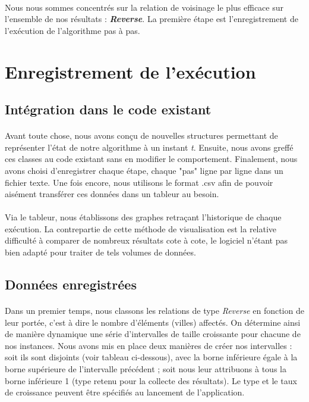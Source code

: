 \documentclass[a4paper,10pt]{report}
\begin{document}
\paragraph{}
Nous nous sommes concentrés sur la relation de voisinage le plus efficace sur
l'ensemble de nos résultats : \textbf{\textit{Reverse}}. La première étape est
l'enregistrement de l'exécution de l'algorithme pas à pas.



\section{Enregistrement de l'exécution}
\subsection{Intégration dans le code existant}

\paragraph{}
  Avant toute chose, nous avons conçu de nouvelles structures permettant de
représenter l'état de notre algorithme à un instant \textit{t}. Ensuite, nous
avons greffé ces classes au code existant sans en modifier le comportement.
Finalement, nous avons choisi d'enregistrer chaque étape, chaque "pas" ligne par
ligne dans un fichier texte. Une fois encore, nous utilisons le format .csv afin
de pouvoir aisément transférer ces données dans un tableur au besoin.

\paragraph{}
  Via le tableur, nous établissons des graphes retraçant l'historique de chaque
exécution. La contrepartie de cette méthode de visualisation est la relative
difficulté à comparer de nombreux résultats cote à cote, le logiciel n'étant pas
bien adapté pour traiter de tels volumes de données.

\subsection{Données enregistrées}

\paragraph{}
  Dans un premier temps, nous classons les relations de type \textit{Reverse}
en fonction de leur portée, c'est à dire le nombre d'éléments (villes) affectés.
On détermine ainsi de manière dynamique une série d'intervalles de taille
croissante pour chacune de nos instances. Nous avons mis en place deux manières
de créer nos intervalles : soit ils sont disjoints (voir tableau ci-dessous),
avec la borne inférieure égale à la borne supérieure de l'intervalle précédent ;
soit nous leur attribuons à tous la borne inférieure 1 (type retenu pour la
collecte des résultats). Le type et le taux de croissance peuvent être spécifiés
au lancement de l'application.
\end{document}
